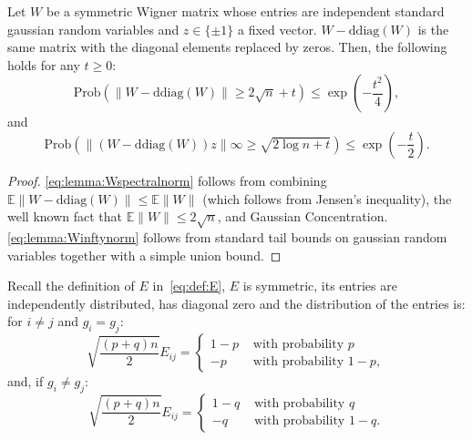 \documentclass{colt2016} %
\newcommand{\trace}{\mathrm{Tr}}
\newcommand{\1}{\mathbf{1}}
\newcommand{\EE}{\mathbb{E}}
\newcommand{\TODO}[1]{{\color{red}{[#1]}}}
\newcommand{\ddiag}{\mathrm{ddiag}}
\begin{document}



\begin{lemma}\label{lemma:Wignermatrices}
 Let $W$ be a symmetric Wigner matrix whose entries are independent standard gaussian random variables and $z\in\{\pm1\}$ a fixed vector. $W-\ddiag(W)$ is the same matrix with the diagonal elements replaced by zeros. Then, the following holds for any $t\geq 0$:
 \begin{equation}\label{eq:lemma:Wspectralnorm}
  \mathrm{Prob}\left( \|W-\ddiag(W)\| \geq 2\sqrt{n} + t \right) \leq \exp\left( - \frac{t^2}4 \right),
 \end{equation}
 and
 \begin{equation}\label{eq:lemma:Winftynorm}
  \mathrm{Prob}\left( \|(W-\ddiag(W))z\|\infty \geq  \sqrt{2\log {n}+t} \right) \leq \exp\left( - \frac{t}2 \right).
 \end{equation}
\end{lemma}
\begin{proof}
\eqref{eq:lemma:Wspectralnorm} follows from combining $\EE\|W-\ddiag(W)\| \leq \EE\|W\|$ (which follows from Jensen's inequality), the well known fact that $\EE\|W\|\leq 2\sqrt{n}$, and Gaussian Concentration. %
\eqref{eq:lemma:Winftynorm} follows from standard tail bounds on gaussian random variables together with a simple union bound.
\end{proof}

Recall the definition of $E$ in~\eqref{eq:def:E}, $E$ is symmetric, its entries are independently distributed, has diagonal zero and the distribution of the entries is: for $i\neq j$ and $g_i=g_j$:
\begin{equation}
\sqrt{\frac{(p+q)n}{2}}E_{ij} = \left\{ \begin{array}{ll}
1 - p  & \text{ with probability }p \\
-p &  \text{ with probability }1-p,
\end{array}\right.
\end{equation}
and, if $g_i\neq g_j$:
\begin{equation}
\sqrt{\frac{(p+q)n}{2}}E_{ij} = \left\{ \begin{array}{ll}
1 - q  & \text{ with probability }q \\
-q &  \text{ with probability }1-q.
\end{array}\right.
\end{equation}
\end{document}
